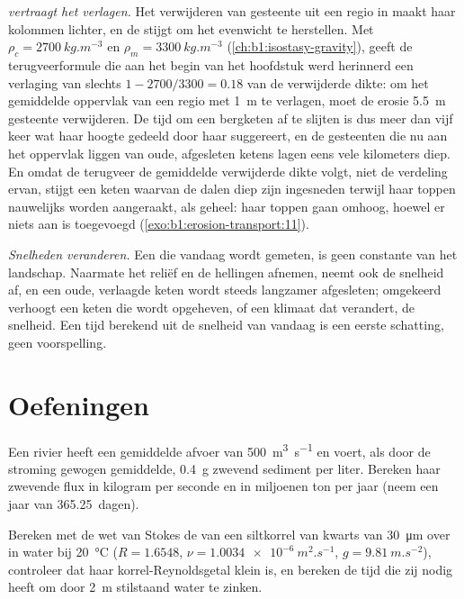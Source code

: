 \emph{ vertraagt het verlagen.} Het verwijderen van gesteente uit een regio in  maakt haar kolommen lichter, en de  stijgt om het evenwicht te herstellen. Met $\rho_c
= \qty{2700}{kg.m^{-3}}$ en $\rho_m = \qty{3300}{kg.m^{-3}}$ (\cref{ch:b1:isostasy-gravity}), geeft de terugveerformule die aan het begin van het hoofdstuk werd herinnerd een verlaging van slechts $1 - 2700/3300 = 0.18$ van de verwijderde dikte: om het gemiddelde oppervlak van een regio met \qty{1}{m} te verlagen, moet de erosie \qty{5.5}{m} gesteente verwijderen. De tijd om een bergketen af te slijten is dus meer dan vijf keer wat haar hoogte gedeeld door haar  suggereert, en de gesteenten die nu aan het oppervlak liggen van oude, afgesleten ketens lagen eens vele kilometers diep. En omdat de terugveer de gemiddelde verwijderde dikte volgt, niet de verdeling ervan, stijgt een keten waarvan de dalen diep zijn ingesneden terwijl haar toppen nauwelijks worden aangeraakt, als geheel: haar toppen gaan omhoog, hoewel er niets aan is toegevoegd (\cref{exo:b1:erosion-transport:11}).

\emph{Snelheden veranderen.} Een  die vandaag wordt gemeten, is geen constante van het landschap. Naarmate het reliëf en de hellingen afnemen, neemt ook de snelheid af, en een oude, verlaagde keten wordt steeds langzamer afgesleten; omgekeerd verhoogt een keten die wordt opgeheven, of een klimaat dat verandert, de snelheid. Een tijd berekend uit de snelheid van vandaag is een eerste schatting, geen voorspelling.

\section{Oefeningen}

\begin{exercise}[$\star$]\label{exo:b1:erosion-transport:1}
Een rivier heeft een gemiddelde afvoer van \qty{500}{m^3.s^{-1}} en voert, als door de stroming gewogen gemiddelde, \qty{0.4}{g} zwevend sediment per liter. Bereken haar zwevende flux in kilogram per seconde en in miljoenen ton per jaar (neem een jaar van \num{365.25}~dagen).
\end{exercise}

\begin{exercise}[$\star$]\label{exo:b1:erosion-transport:2}
Bereken met de wet van Stokes de  van een siltkorrel van kwarts van \qty{30}{\micro m} over in water bij \qty{20}{\celsius} ($R = 1.6548$, $\nu =
\qty{1.0034e-6}{m^2.s^{-1}}$, $g = \qty{9.81}{m.s^{-2}}$), controleer dat haar korrel-Reynoldsgetal klein is, en bereken de tijd die zij nodig heeft om door \qty{2}{m} stilstaand water te zinken.
\end{exercise}

